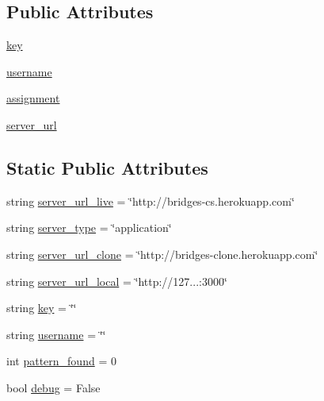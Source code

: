 \subsection*{Public Attributes}
\begin{DoxyCompactItemize}
\item 
\mbox{\hyperlink{class_bridges_1_1connector_1_1_connector_aec2420c13d254608819cae41f3f195cd}{key}}
\item 
\mbox{\hyperlink{class_bridges_1_1connector_1_1_connector_ab87dbc1ca549f3c2b4ac5a19abcc20e0}{username}}
\item 
\mbox{\hyperlink{class_bridges_1_1connector_1_1_connector_a1f6453ca6554da7ea99be8e55b51b4bf}{assignment}}
\item 
\mbox{\hyperlink{class_bridges_1_1connector_1_1_connector_a8795d2c7dca04e053f89ded81fe1a119}{server\+\_\+url}}
\end{DoxyCompactItemize}
\subsection*{Static Public Attributes}
\begin{DoxyCompactItemize}
\item 
string \mbox{\hyperlink{class_bridges_1_1connector_1_1_connector_a09a97560dfa55c54150995cabac1e3d6}{server\+\_\+url\+\_\+live}} = \char`\"{}http\+://bridges-\/cs.\+herokuapp.\+com\char`\"{}
\item 
string \mbox{\hyperlink{class_bridges_1_1connector_1_1_connector_a6c173137459a0459e44d3c60b9ed87fb}{server\+\_\+type}} = \char`\"{}application\char`\"{}
\item 
string \mbox{\hyperlink{class_bridges_1_1connector_1_1_connector_a0759bc6496c03d8faafdd0612537e7d3}{server\+\_\+url\+\_\+clone}} = \char`\"{}http\+://bridges-\/clone.\+herokuapp.\+com\char`\"{}
\item 
string \mbox{\hyperlink{class_bridges_1_1connector_1_1_connector_a546bccb78927ff9573cee8caa41b210e}{server\+\_\+url\+\_\+local}} = \char`\"{}http\+://127...\+:3000\char`\"{}
\item 
string \mbox{\hyperlink{class_bridges_1_1connector_1_1_connector_abea85b824f7ab9c52c70c9d6bcf4fa74}{key}} = \char`\"{}\char`\"{}
\item 
string \mbox{\hyperlink{class_bridges_1_1connector_1_1_connector_aeab093f0dd4b59e46ab280bf7af5ffb8}{username}} = \char`\"{}\char`\"{}
\item 
int \mbox{\hyperlink{class_bridges_1_1connector_1_1_connector_a671d65c7d835316c0b2b17d910bbd1c0}{pattern\+\_\+found}} = 0
\item 
bool \mbox{\hyperlink{class_bridges_1_1connector_1_1_connector_ab46baf017aad2b10ffdcaf90f454806c}{debug}} = False
\end{DoxyCompactItemize}


